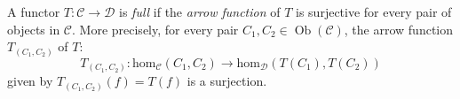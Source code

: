 \documentclass[12pt]{article}
\begin{document}

A functor $T:\mathcal{C}\to\mathcal{D}$ is \emph{full} if the \emph{arrow function} of $T$ is surjective for every 
pair of objects in $\mathcal{C}$.  More precisely, for every pair $C_1, C_2\in \operatorname{Ob}(\mathcal{C})$, the 
arrow function $T_{(C_1,C_2)}$ of $T:$ 
$$T_{(C_1,C_2)}:\operatorname{hom_{\mathcal{C}}}(C_1,C_2)\to\operatorname{hom_{\mathcal{D}}}(T(C_1),T(C_2))$$
given by $T_{(C_1,C_2)}(f)=T(f)$ is a surjection.
\end{document}
